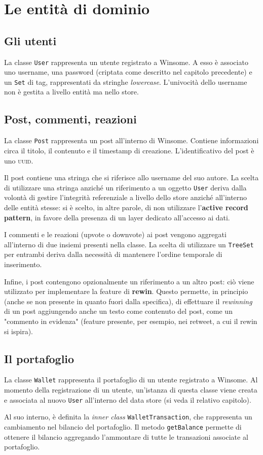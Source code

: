 \documentclass[a4paper,8pt]{article} %
\def\code#1{\texttt{#1}}
\begin{document}
\section{Le entità di dominio}
\subsection{Gli utenti}
La classe \code{User} rappresenta un utente registrato a Winsome. A esso è associato uno username, una password (criptata come descritto nel capitolo precedente) e un \code{Set} di tag,
rappresentati da stringhe \emph{lowercase}. L'univocità dello username non è gestita a livello entità ma nello store.
\subsection{Post, commenti, reazioni}
La classe \code{Post} rappresenta un post all'interno di Winsome. Contiene informazioni circa il titolo, il contenuto e il timestamp di creazione. L'identificativo del post è uno \textsc{uuid}.
\par Il post contiene una stringa che si riferisce allo username del suo autore. La scelta di utilizzare una stringa anziché un riferimento a un oggetto \code{User} deriva dalla volontà
di gestire l'integrità referenziale a livello dello store anziché all'interno delle entità stesse: si è scelto, in altre parole, di non utilizzare l'\textbf{active record pattern}, in favore
della presenza di un layer dedicato all'accesso ai dati.
\par I commenti e le reazioni (upvote o downvote) ai post vengono aggregati all'interno di due insiemi presenti nella classe. La scelta di utilizzare un \code{TreeSet} per entrambi deriva
dalla necessità di mantenere l'ordine temporale di inserimento.
\par Infine, i post contengono opzionalmente un riferimento a un altro post: ciò viene utilizzato per implementare la feature di \textbf{rewin}. Questo permette, in principio (anche se non
presente in quanto fuori dalla specifica), di effettuare il \emph{rewinning} di un post aggiungendo anche un testo come contenuto del post, come un "commento in evidenza" (feature presente,
per esempio, nei retweet, a cui il rewin si ispira).
\subsection{Il portafoglio}
La classe \code{Wallet} rappresenta il portafoglio di un utente registrato a Winsome. Al momento della registrazione di un utente, un'istanza di questa classe viene creata
e associata al nuovo \code{User} all'interno del data store (si veda il relativo capitolo).
\par Al suo interno, è definita la \emph{inner class} \code{WalletTransaction}, che rappresenta un cambiamento nel bilancio del portafoglio. Il metodo \code{getBalance} permette di ottenere il bilancio
aggregando l'ammontare di tutte le transazioni associate al portafoglio.
\end{document}
